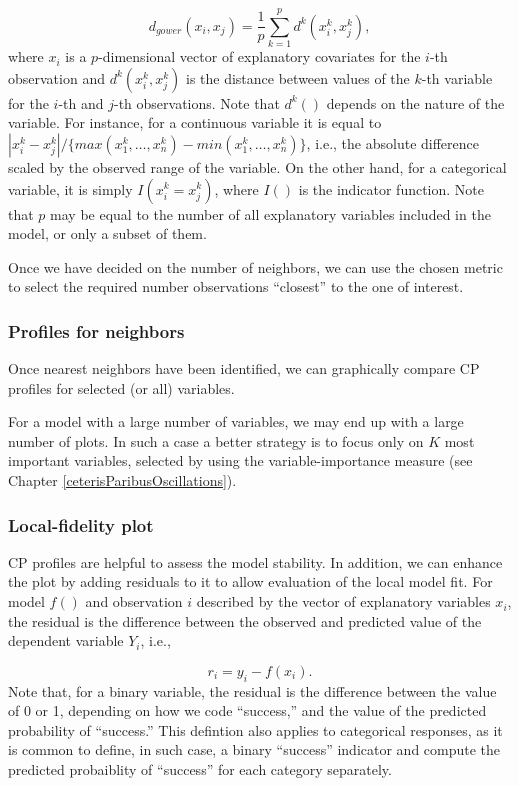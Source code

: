 \documentclass[12pt,]{krantz}
\theoremstyle{definition}
\theoremstyle{definition}
\theoremstyle{definition}
\theoremstyle{remark}
\begin{document}
\[
d_{gower}(x_i, x_j) = \frac 1p \sum_{k=1}^p d^k(x_i^k, x_j^k),
\] where \(x_i\) is a \(p\)-dimensional vector of explanatory covariates
for the \(i\)-th observation and \(d^k(x_i^k,x_j^k)\) is the distance
between values of the \(k\)-th variable for the \(i\)-th and \(j\)-th
observations. Note that \(d^k()\) depends on the nature of the variable.
For instance, for a continuous variable it is equal to
\(|x_i^k-x_j^k|/\{max(x_1^k,\ldots,x_n^k)-min(x_1^k,\ldots,x_n^k)\}\),
i.e., the absolute difference scaled by the observed range of the
variable. On the other hand, for a categorical variable, it is simply
\(I(x_i^k = x_j^k)\), where \(I()\) is the indicator function. Note that
\(p\) may be equal to the number of all explanatory variables included
in the model, or only a subset of them.

Once we have decided on the number of neighbors, we can use the chosen
metric to select the required number observations ``closest'' to the one
of interest.

\hypertarget{cPLocDiagProfiles}{%
\subsubsection{Profiles for neighbors}\label{cPLocDiagProfiles}}

Once nearest neighbors have been identified, we can graphically compare
CP profiles for selected (or all) variables.

For a model with a large number of variables, we may end up with a large
number of plots. In such a case a better strategy is to focus only on
\(K\) most important variables, selected by using the
variable-importance measure (see Chapter
\ref{ceterisParibusOscillations}).

\hypertarget{cPLocDiagLFplot}{%
\subsubsection{Local-fidelity plot}\label{cPLocDiagLFplot}}

CP profiles are helpful to assess the model stability. In addition, we
can enhance the plot by adding residuals to it to allow evaluation of
the local model fit. For model \(f()\) and observation \(i\) described
by the vector of explanatory variables \(x_i\), the residual is the
difference between the observed and predicted value of the dependent
variable \(Y_i\), i.e.,

\[
r_i = y_i - f(x_i).
\] Note that, for a binary variable, the residual is the difference
between the value of 0 or 1, depending on how we code ``success,'' and
the value of the predicted probability of ``success.'' This defintion
also applies to categorical responses, as it is common to define, in
such case, a binary ``success'' indicator and compute the predicted
probaiblity of ``success'' for each category separately.
\end{document}
